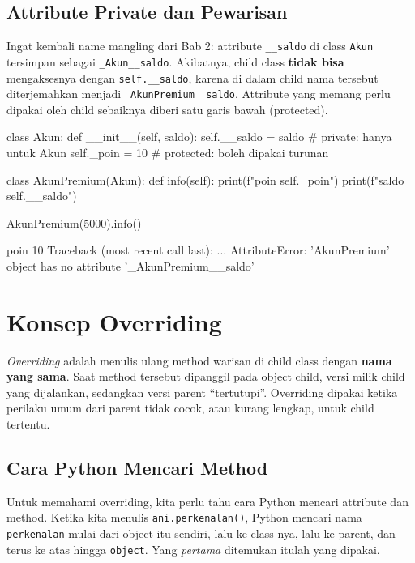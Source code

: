 \subsection{Attribute Private dan Pewarisan}

Ingat kembali name mangling dari Bab 2: attribute \texttt{\_\_saldo} di class \texttt{Akun} tersimpan sebagai \texttt{\_Akun\_\_saldo}. Akibatnya, child class \textbf{tidak bisa} mengaksesnya dengan \texttt{self.\_\_saldo}, karena di dalam child nama tersebut diterjemahkan menjadi \texttt{\_AkunPremium\_\_saldo}. Attribute yang memang perlu dipakai oleh child sebaiknya diberi satu garis bawah (protected).

\begin{kode}
class Akun:
    def __init__(self, saldo):
        self.__saldo = saldo     # private: hanya untuk Akun
        self._poin = 10          # protected: boleh dipakai turunan

class AkunPremium(Akun):
    def info(self):
        print(f"poin {self._poin}")
        print(f"saldo {self.__saldo}")

AkunPremium(5000).info()
\end{kode}

\begin{keluaran}
poin 10
Traceback (most recent call last):
  ...
AttributeError: 'AkunPremium' object has no attribute '_AkunPremium__saldo'
\end{keluaran}

\section{Konsep Overriding}

\emph{Overriding} adalah menulis ulang method warisan di child class dengan \textbf{nama yang sama}. Saat method tersebut dipanggil pada object child, versi milik child yang dijalankan, sedangkan versi parent ``tertutupi''. Overriding dipakai ketika perilaku umum dari parent tidak cocok, atau kurang lengkap, untuk child tertentu.

\subsection{Cara Python Mencari Method}

Untuk memahami overriding, kita perlu tahu cara Python mencari attribute dan method. Ketika kita menulis \texttt{ani.perkenalan()}, Python mencari nama \texttt{perkenalan} mulai dari object itu sendiri, lalu ke class-nya, lalu ke parent, dan terus ke atas hingga \texttt{object}. Yang \emph{pertama} ditemukan itulah yang dipakai.

